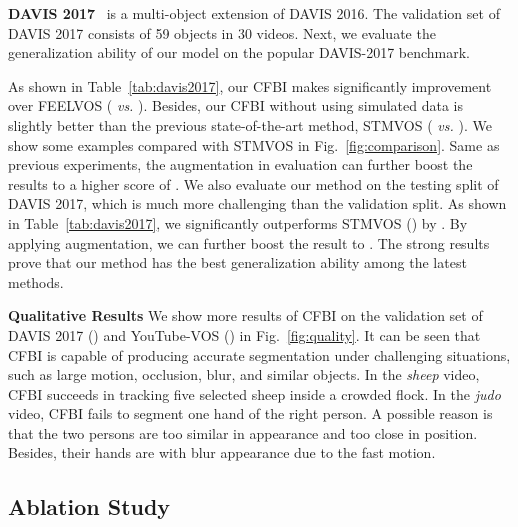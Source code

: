 \documentclass[runningheads]{llncs}
\begin{document}
\noindent \textbf{DAVIS 2017}~\cite{davis2017} is a multi-object extension of DAVIS 2016. The validation set of DAVIS 2017 consists of 59 objects in 30 videos.
Next, we evaluate the generalization ability of our model on the popular DAVIS-2017 benchmark. 


As shown in Table~\ref{tab:davis2017}, our CFBI makes significantly improvement over FEELVOS ( \emph{vs.}\hspace{-0.8mm} ). Besides, our CFBI without using simulated data is slightly better than the previous state-of-the-art method, STMVOS ( \emph{vs.}\hspace{-0.8mm} ). We show some examples compared with STMVOS in Fig.~\ref{fig:comparison}. Same as previous experiments, the augmentation in evaluation can further boost the results to a higher score of . We also evaluate our method on the testing split of DAVIS 2017, which is much more challenging than the validation split. As shown in Table~\ref{tab:davis2017}, we significantly outperforms STMVOS () by . By applying augmentation, we can further boost the result to . The strong results prove that our method has the best generalization ability among the latest methods.





\noindent \textbf{Qualitative Results} We show more results of CFBI on the validation set of DAVIS 2017 () and YouTube-VOS () in Fig.~\ref{fig:quality}. It can be seen that CFBI is capable of producing accurate segmentation under challenging situations, such as large motion, occlusion, blur, and similar objects. In the \emph{sheep} video, CFBI succeeds in tracking five selected sheep inside a crowded flock. In the \emph{judo} video, CFBI fails to segment one hand of the right person. A possible reason is that the two persons are too similar in appearance and too close in position. Besides, their hands are with blur appearance due to the fast motion.




\subsection{Ablation Study}
\end{document}
